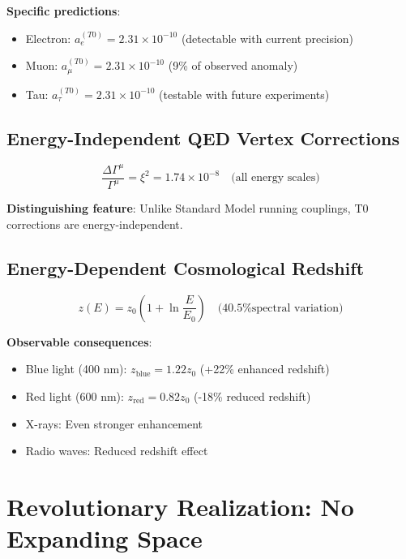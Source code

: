 \documentclass[12pt,a4paper]{article}
\begin{document}
	\textbf{Specific predictions}:
	\begin{itemize}
		\item Electron: $a_e^{(T0)} = 2.31 \times 10^{-10}$ (detectable with current precision)
		\item Muon: $a_{\mu}^{(T0)} = 2.31 \times 10^{-10}$ (9\% of observed anomaly)
		\item Tau: $a_{\tau}^{(T0)} = 2.31 \times 10^{-10}$ (testable with future experiments)
	\end{itemize}
	
	\subsection{Energy-Independent QED Vertex Corrections}
	
	\begin{equation}
		\frac{\Delta\Gamma^{\mu}}{\Gamma^{\mu}} = \xi^2 = 1.74 \times 10^{-8} \quad \text{(all energy scales)}
		\label{eq:universal_qed_correction}
	\end{equation}
	
	\textbf{Distinguishing feature}: Unlike Standard Model running couplings, T0 corrections are energy-independent.
	
	\subsection{Energy-Dependent Cosmological Redshift}
	
	\begin{equation}
		z(E) = z_0\left(1 + \ln\frac{E}{E_0}\right) \quad \text{(40.5\% spectral variation)}
		\label{eq:energy_dependent_redshift_extended}
	\end{equation}
	
	\textbf{Observable consequences}:
	\begin{itemize}
		\item Blue light (400 nm): $z_{\text{blue}} = 1.22 z_0$ (+22\% enhanced redshift)
		\item Red light (600 nm): $z_{\text{red}} = 0.82 z_0$ (-18\% reduced redshift)
		\item X-rays: Even stronger enhancement
		\item Radio waves: Reduced redshift effect
	\end{itemize}
	
	\section{Revolutionary Realization: No Expanding Space}
	
\end{document}
